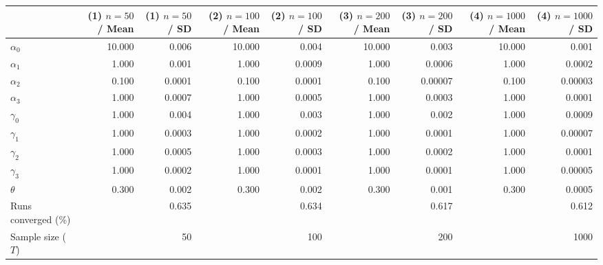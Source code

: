
\begin{tabular}[t]{lrrrrrrrr}
\toprule
  & (1) $n=50$ / Mean & (1) $n=50$ / SD & (2) $n=100$ / Mean & (2) $n=100$ / SD & (3) $n=200$ / Mean & (3) $n=200$ / SD & (4) $n=1000$ / Mean & (4) $n=1000$ / SD\\
\midrule
$\alpha_{0}$ & 10.000 & 0.006 & 10.000 & 0.004 & 10.000 & 0.003 & 10.000 & 0.001\\
$\alpha_{1}$ & 1.000 & 0.001 & 1.000 & 0.0009 & 1.000 & 0.0006 & 1.000 & 0.0002\\
$\alpha_{2}$ & 0.100 & 0.0001 & 0.100 & 0.0001 & 0.100 & 0.00007 & 0.100 & 0.00003\\
$\alpha_{3}$ & 1.000 & 0.0007 & 1.000 & 0.0005 & 1.000 & 0.0003 & 1.000 & 0.0001\\
$\gamma_{0}$ & 1.000 & 0.004 & 1.000 & 0.003 & 1.000 & 0.002 & 1.000 & 0.0009\\
$\gamma_{1}$ & 1.000 & 0.0003 & 1.000 & 0.0002 & 1.000 & 0.0001 & 1.000 & 0.00007\\
$\gamma_{2}$ & 1.000 & 0.0005 & 1.000 & 0.0003 & 1.000 & 0.0002 & 1.000 & 0.0001\\
$\gamma_{3}$ & 1.000 & 0.0002 & 1.000 & 0.0001 & 1.000 & 0.0001 & 1.000 & 0.00005\\
$\theta$ & 0.300 & 0.002 & 0.300 & 0.002 & 0.300 & 0.001 & 0.300 & 0.0005\\
Runs converged (\%) &  & 0.635 &  & 0.634 &  & 0.617 &  & 0.612\\
Sample size ($T$) &  & 50 &  & 100 &  & 200 &  & 1000\\
\bottomrule
\end{tabular}
